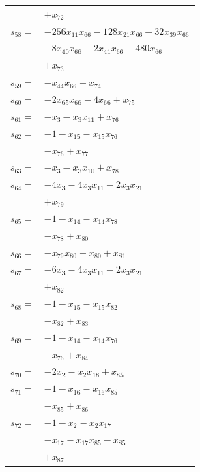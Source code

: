 \begin{longtable}{@{}r@{\;}l@{}}
 & \(\displaystyle +x_{72}\) \\[3pt]
\(s_{58}=\) & \(\displaystyle -256x_{11}x_{66} -128x_{21}x_{66} -32x_{39}x_{66}\) \\
 & \(\displaystyle -8x_{40}x_{66} -2x_{41}x_{66} -480x_{66}\) \\
 & \(\displaystyle +x_{73}\) \\[3pt]
\(s_{59}=\) & \(\displaystyle -x_{44}x_{66} +x_{74}\) \\[3pt]
\(s_{60}=\) & \(\displaystyle -2x_{65}x_{66} -4x_{66} +x_{75}\) \\[3pt]
\(s_{61}=\) & \(\displaystyle -x_{3} -x_{3}x_{11} +x_{76}\) \\[3pt]
\(s_{62}=\) & \(\displaystyle -1 -x_{15} -x_{15}x_{76}\) \\
 & \(\displaystyle -x_{76} +x_{77}\) \\[3pt]
\(s_{63}=\) & \(\displaystyle -x_{3} -x_{3}x_{10} +x_{78}\) \\[3pt]
\(s_{64}=\) & \(\displaystyle -4x_{3} -4x_{3}x_{11} -2x_{3}x_{21}\) \\
 & \(\displaystyle +x_{79}\) \\[3pt]
\(s_{65}=\) & \(\displaystyle -1 -x_{14} -x_{14}x_{78}\) \\
 & \(\displaystyle -x_{78} +x_{80}\) \\[3pt]
\(s_{66}=\) & \(\displaystyle -x_{79}x_{80} -x_{80} +x_{81}\) \\[3pt]
\(s_{67}=\) & \(\displaystyle -6x_{3} -4x_{3}x_{11} -2x_{3}x_{21}\) \\
 & \(\displaystyle +x_{82}\) \\[3pt]
\(s_{68}=\) & \(\displaystyle -1 -x_{15} -x_{15}x_{82}\) \\
 & \(\displaystyle -x_{82} +x_{83}\) \\[3pt]
\(s_{69}=\) & \(\displaystyle -1 -x_{14} -x_{14}x_{76}\) \\
 & \(\displaystyle -x_{76} +x_{84}\) \\[3pt]
\(s_{70}=\) & \(\displaystyle -2x_{2} -x_{2}x_{18} +x_{85}\) \\[3pt]
\(s_{71}=\) & \(\displaystyle -1 -x_{16} -x_{16}x_{85}\) \\
 & \(\displaystyle -x_{85} +x_{86}\) \\[3pt]
\(s_{72}=\) & \(\displaystyle -1 -x_{2} -x_{2}x_{17}\) \\
 & \(\displaystyle -x_{17} -x_{17}x_{85} -x_{85}\) \\
 & \(\displaystyle +x_{87}\) \\[3pt]

\end{longtable}
